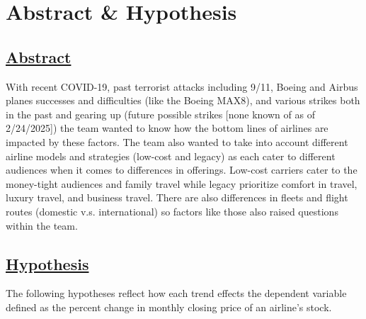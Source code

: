 \documentclass[12pt]{report}
\begin{document}

    \newpage
{}
    \newpage
\newpage
\tableofcontents
\newpage

\chapter*{Abstract \& Hypothesis}
\section*{\underline{Abstract}}
With recent COVID-19, past terrorist attacks including 9/11, Boeing and Airbus planes successes and difficulties (like the Boeing MAX8), and various strikes both in the past and gearing up (future possible strikes [none known of as of 2/24/2025]) the team wanted to know how the bottom lines of airlines are impacted by these factors.
The team also wanted to take into account different airline models and strategies (low-cost and legacy) as each cater to different audiences when it comes to differences in offerings.
Low-cost carriers cater to the money-tight audiences and family travel while legacy prioritize comfort in travel, luxury travel, and business travel.
There are also differences in fleets and flight routes (domestic v.s. international) so factors like those also raised questions within the team.
\newpage
\section*{\underline{Hypothesis}}
The following  hypotheses reflect how each trend effects the dependent variable defined as the percent change in monthly closing price of an airline's stock.
\end{document}
